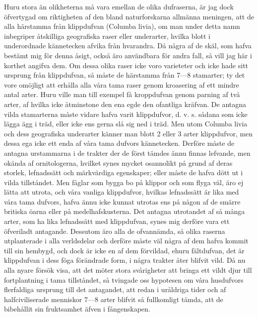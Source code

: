 Huru stora än olikheterna må vara emellan de olika dufraserna, är jag dock öfvertygad om riktigheten af den bland naturforskarna allmänna meningen, att de alla härstamma från klippdufvan (Columba livia), om man under detta namn inbegriper åtskilliga geografiska raser eller underarter, hvilka blott i underordnade kännetecken afvika från hvarandra. Då några af de skäl, som hafva bestämt mig för denna åsigt, också äro användbara för andra fall, så vill jag här i korthet angifva dem. Om dessa olika raser icke voro varieteter och icke hade sitt ursprung från klippdufvan, så måste de härstamma från 7—8 stamarter; ty det vore omöjligt att erhålla alla våra tama raser genom kroasering af ett mindre antal arter. Huru ville man till exempel få kroppdufvan genom parning af två arter, af hvilka icke åtminstone den ena egde den ofantliga kräfvan. De antagna vilda stamarterna måste vidare hafva varit klippdufvor, d. v. s. sådana som icke lägga ägg i träd, eller icke ens gerna slå sig ned i träd. Men utom Columba livia och dess geografiska underarter känner man blott 2 eller 3 arter klippdufvor, men dessa ega icke ett enda af våra tama dufvors kännetecken. Derföre måste de antagna urstammarna i de trakter der de först tämdes ännu finnas lefvande, men okända af ornitologerna, hvilket synes mycket osannolikt på grund af deras storlek, lefnadssätt och märkvärdiga egenskaper; eller måste de hafva dött ut i vilda tillståndet. Men fåglar som bygga bo på klippor och som flyga väl, äro ej lätta att utrota, och våra vanliga klippdufvor, hvilkas lefnadssätt är lika med våra tama dufvors, hafva ännu icke kunnat utrotas ens på någon af de smärre britiska öarna eller på medelhafskusterna. Det antagna utrotandet af så många arter, som ha lika lefnadssätt med klippdufvan, synes mig derföre vara ett öfveriladt antagande. Dessutom äro alla de ofvannämda, så olika raserna utplanterade i alla verldsdelar och derföre måste väl några af dem hafva kommit till sin hembygd, och dock är icke en af dem förvildad, ehuru fältdufvan, det är klippdufvan i dess föga förändrade form, i några trakter åter blifvit vild. Då nu alla nyare försök visa, att det möter stora svårigheter att bringa ett vildt djur till fortplantning i tama tillståndet, så tvingade oss hypotesen om våra husdufvors flerfaldiga ursprung till det antagandet, att redan i uråldriga tider och af halfciviliserade menniskor 7—8 arter blifvit så fullkomligt tämda, att de bibehållit sin fruktsamhet äfven i fångenskapen.

